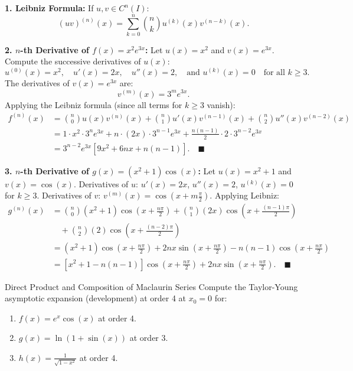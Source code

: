 \begin{tabletworkspace}[5.0cm]
\end{tabletworkspace}

\begin{solution}
\textbf{1. Leibniz Formula:}
If $u, v \in C^n(I)$:
\[
(uv)^{(n)}(x) = \sum_{k=0}^n \binom{n}{k} u^{(k)}(x) v^{(n-k)}(x).
\]

\textbf{2. $n$-th Derivative of $f(x) = x^2 e^{3x}$:}
Let $u(x) = x^2$ and $v(x) = e^{3x}$.
Compute the successive derivatives of $u(x)$:
\[
u^{(0)}(x) = x^2, \quad u'(x) = 2x, \quad u''(x) = 2, \quad \text{and } u^{(k)}(x) = 0 \quad \text{for all } k \ge 3.
\]
The derivatives of $v(x) = e^{3x}$ are:
\[
v^{(m)}(x) = 3^m e^{3x}.
\]
Applying the Leibniz formula (since all terms for $k \ge 3$ vanish):
\begin{align*}
f^{(n)}(x) &= \binom{n}{0} u(x) v^{(n)}(x) + \binom{n}{1} u'(x) v^{(n-1)}(x) + \binom{n}{2} u''(x) v^{(n-2)}(x) \\
&= 1 \cdot x^2 \cdot 3^n e^{3x} + n \cdot (2x) \cdot 3^{n-1} e^{3x} + \frac{n(n-1)}{2} \cdot 2 \cdot 3^{n-2} e^{3x} \\
&= 3^{n-2} e^{3x} \left[ 9x^2 + 6nx + n(n-1) \right]. \quad \blacksquare
\end{align*}

\textbf{3. $n$-th Derivative of $g(x) = (x^2 + 1)\cos(x)$:}
Let $u(x) = x^2 + 1$ and $v(x) = \cos(x)$.
Derivatives of $u$: $u'(x) = 2x$, $u''(x) = 2$, $u^{(k)}(x) = 0$ for $k \ge 3$.
Derivatives of $v$: $v^{(m)}(x) = \cos\left(x + m\frac{\pi}{2}\right)$.
Applying Leibniz:
\begin{align*}
g^{(n)}(x) &= \binom{n}{0} (x^2 + 1) \cos\left(x + \frac{n\pi}{2}\right) + \binom{n}{1} (2x) \cos\left(x + \frac{(n-1)\pi}{2}\right) \\
&\quad + \binom{n}{2} (2) \cos\left(x + \frac{(n-2)\pi}{2}\right) \\
&= (x^2 + 1)\cos\left(x + \frac{n\pi}{2}\right) + 2nx \sin\left(x + \frac{n\pi}{2}\right) - n(n-1)\cos\left(x + \frac{n\pi}{2}\right) \\
&= \left[ x^2 + 1 - n(n-1) \right] \cos\left(x + \frac{n\pi}{2}\right) + 2nx \sin\left(x + \frac{n\pi}{2}\right). \quad \blacksquare
\end{align*}
\end{solution}

\begin{exercise}{Direct Product and Composition of Maclaurin Series}
Compute the Taylor-Young asymptotic expansion (development) at order 4 at $x_0 = 0$ for:
\begin{enumerate}[leftmargin=1.5em,itemsep=2pt]
  \item $f(x) = e^x \cos(x)$ at order 4.
  \item $g(x) = \ln(1 + \sin(x))$ at order 3.
  \item $h(x) = \frac{1}{\sqrt{1 - x^2}}$ at order 4.
\end{enumerate}
\end{exercise}

